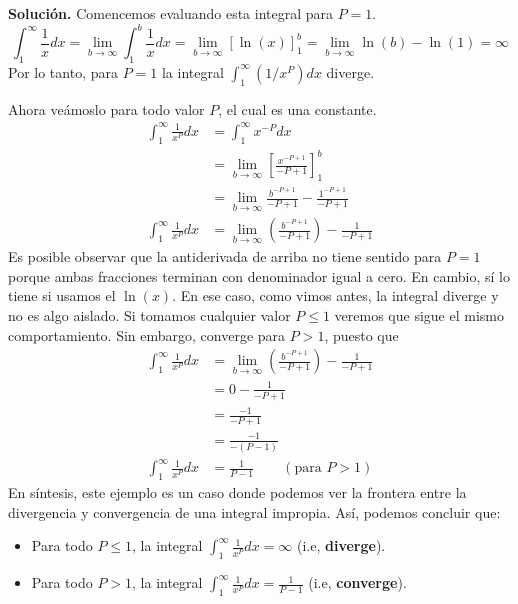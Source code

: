 \documentclass[12pt]{article}
\begin{document}
\textbf{Solución.} Comencemos evaluando esta integral para $P = 1$.
\[
  \int_{1}^{\infty} \frac{1}{x} dx = \lim_{b \to \infty} \int_{1}^{b} \frac{1}{x} dx
                                   = \lim_{b \to \infty} [\ln(x)]_{1}^{b}
                                   = \lim_{b \to \infty} \ln(b) - \ln(1)
                                   = \infty
\]
Por lo tanto, para $P = 1$ la integral $\int_{1}^{\infty} (1/x^{P})dx$ diverge.

Ahora veámoslo para todo valor $P$, el cual es una constante.
\begin{align*}
  \int_{1}^{\infty} \frac{1}{x^{P}} dx &= \int_{1}^{\infty} x^{-P} dx \\
                                       &= \lim_{b \to \infty} \left[\frac{x^{-P + 1}}{-P + 1}\right]_{1}^{b} \\
                                       &= \lim_{b \to \infty} \frac{b^{-P + 1}}{-P + 1} - \frac{1^{-P + 1}}{-P + 1} \\
  \int_{1}^{\infty} \frac{1}{x^{P}} dx &= \lim_{b \to \infty} \left(\frac{b^{-P + 1}}{-P + 1}\right) - \frac{1}{-P + 1}
\end{align*}
Es posible observar que la antiderivada de arriba no tiene sentido para $P = 1$ porque ambas fracciones terminan con denominador igual a cero. En cambio, sí lo tiene si usamos el $\ln(x)$. En ese caso, como vimos antes, la integral diverge y no es algo aislado. Si tomamos cualquier valor $P \leq 1$ veremos que sigue el mismo comportamiento. Sin embargo, converge para $P > 1$, puesto que
\begin{align*}
  \int_{1}^{\infty} \frac{1}{x^{P}} dx &= \lim_{b \to \infty} \left(\frac{b^{-P + 1}}{-P + 1}\right) - \frac{1}{-P + 1} \\
                                       &= 0 - \frac{1}{-P + 1} \\
                                       &= \frac{-1}{-P + 1} \\
                                       &= \frac{-1}{-(P - 1)} \\
  \int_{1}^{\infty} \frac{1}{x^{P}} dx &= \frac{1}{P - 1} \qquad (\text{para } P > 1)
\end{align*}
En síntesis, este ejemplo es un caso donde podemos ver la frontera entre la divergencia y convergencia de una integral impropia. Así, podemos concluir que:

\begin{itemize}
\item Para todo $P \leq 1$, la integral $\displaystyle \int_{1}^{\infty} \frac{1}{x^{P}} dx = \infty$ (i.e, \textbf{diverge}).
\item Para todo $P > 1$, la integral $\displaystyle \int_{1}^{\infty} \frac{1}{x^{P}} dx = \frac{1}{P - 1}$ (i.e, \textbf{converge}).
\end{itemize}
\end{document}
